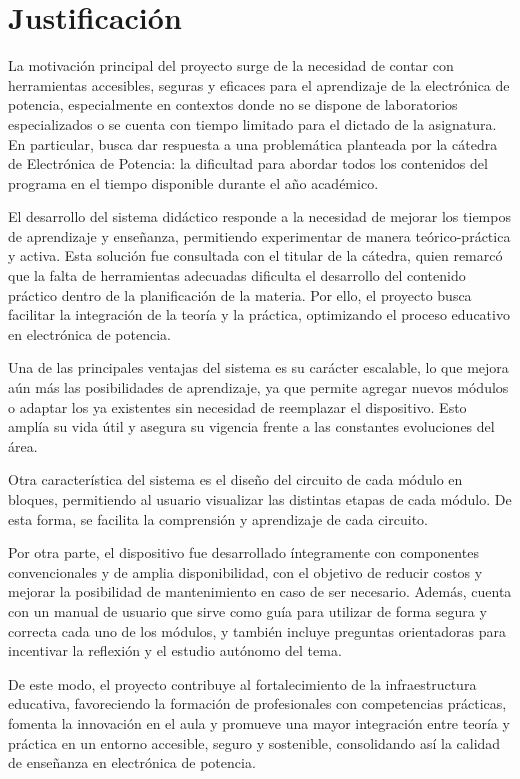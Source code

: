 \section{Justificación}
\justifying

La motivación principal del proyecto surge de la necesidad de contar con herramientas accesibles, seguras y eficaces para el aprendizaje de la electrónica de potencia, especialmente en contextos donde no se dispone de laboratorios especializados o se cuenta con tiempo limitado para el dictado de la asignatura. En particular, busca dar respuesta a una problemática planteada por la cátedra de Electrónica de Potencia: la dificultad para abordar todos los contenidos del programa en el tiempo disponible durante el año académico.

El desarrollo del sistema didáctico responde a la necesidad de mejorar los tiempos de aprendizaje y enseñanza, permitiendo experimentar de manera teórico-práctica y activa. Esta solución fue consultada con el titular de la cátedra, quien remarcó que la falta de herramientas adecuadas dificulta el desarrollo del contenido práctico dentro de la planificación de la materia. Por ello, el proyecto busca facilitar la integración de la teoría y la práctica, optimizando el proceso educativo en electrónica de potencia.

Una de las principales ventajas del sistema es su carácter escalable, lo que mejora aún más las posibilidades de aprendizaje, ya que permite agregar nuevos módulos o adaptar los ya existentes sin necesidad de reemplazar el dispositivo. Esto amplía su vida útil y asegura su vigencia frente a las constantes evoluciones del área. 

Otra característica del sistema es el diseño del circuito de cada módulo en bloques, permitiendo al usuario visualizar las distintas etapas de cada módulo. De esta forma, se facilita la comprensión y aprendizaje de cada circuito.

Por otra parte, el dispositivo fue desarrollado íntegramente con componentes convencionales y de amplia disponibilidad, con el objetivo de reducir costos y mejorar la posibilidad de mantenimiento en caso de ser necesario. Además, cuenta con un manual de usuario que sirve como guía para utilizar de forma segura y correcta cada uno de los módulos, y también incluye preguntas orientadoras para incentivar la reflexión y el estudio autónomo del tema.

De este modo, el proyecto contribuye al fortalecimiento de la infraestructura educativa, favoreciendo la formación de profesionales con competencias prácticas, fomenta la innovación en el aula y promueve una mayor integración entre teoría y práctica en un entorno accesible, seguro y sostenible, consolidando así la calidad de enseñanza en electrónica de potencia.